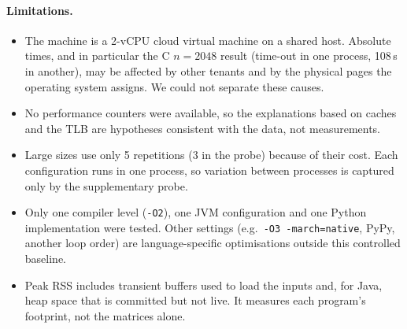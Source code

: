 \documentclass[10pt,a4paper]{article}
\begin{document}
\paragraph{Limitations.}
\begin{itemize}
\item The machine is a 2-vCPU cloud virtual machine on a shared host. Absolute times, and in
particular the C $n=2048$ result (time-out in one process, 108\,s in another), may be affected by
other tenants and by the physical pages the operating system assigns. We could not separate these
causes.
\item No performance counters were available, so the explanations based on caches and the TLB are
hypotheses consistent with the data, not measurements.
\item Large sizes use only 5 repetitions (3 in the probe) because of their cost. Each
configuration runs in one process, so variation between processes is captured only by the
supplementary probe.
\item Only one compiler level (\texttt{-O2}), one JVM configuration and one Python implementation
were tested. Other settings (e.g.\ \texttt{-O3 -march=native}, PyPy, another loop order) are
language-specific optimisations outside this controlled baseline.
\item Peak RSS includes transient buffers used to load the inputs and, for Java, heap space that
is committed but not live. It measures each program's footprint, not the matrices alone.
\end{itemize}

\end{document}

